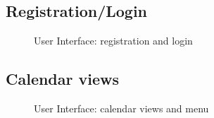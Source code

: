 \subsection{Registration/Login}
\label{subsec:registration}
\begin{figure}[!h]
	\centering
	\caption{User Interface: registration and login}
\end{figure}
\clearpage

\subsection{Calendar views}
\label{subsec:view}
\begin{figure}[!h]
	\centering
	\caption{User Interface: calendar views and menu}
\end{figure}
\clearpage

